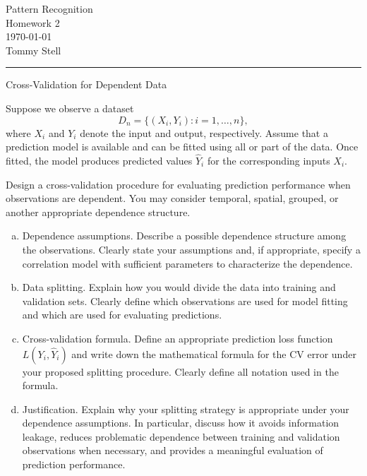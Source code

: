 \documentclass[12pt,letterpaper, onecolumn]{exam}
\begin{document}
\begingroup
    \centering
    \LARGE Pattern Recognition\\
    \LARGE Homework 2\\[0.5em]
    \large \today\\[0.5em]
    \large Tommy Stell\par

\endgroup
\noindent\rule{\textwidth}{0.4pt}
\pointsdroppedatright   %
\printanswers
\renewcommand{\solutiontitle}{\noindent\textbf{Ans:}\enspace}   %

\begin{questions}

    \question Cross-Validation for Dependent Data

    Suppose we observe a dataset
    \begin{equation*}
        D_n = \{(X_i, Y_i) : i = 1,\dots,n\},
    \end{equation*}
    where $X_i$ and $Y_i$ denote the input and output, respectively. Assume that a prediction model is available and can be fitted using all or part of the data. Once fitted, the model produces predicted values $\hat Y_i$ for the corresponding inputs $X_i$.

    Design a cross-validation procedure for evaluating prediction performance when observations are dependent. You may consider temporal, spatial, grouped, or another appropriate dependence structure.
    \begin{enumerate}[(a)]
        \item Dependence assumptions. Describe a possible dependence structure among the observations. Clearly state your assumptions and, if appropriate, specify a correlation model with sufficient parameters to characterize the dependence.
        \item Data splitting. Explain how you would divide the data into training and validation sets. Clearly define which observations are used for model fitting and which are used for evaluating predictions.
        \item Cross-validation formula. Define an appropriate prediction loss function $L(Y_i,\hat Y_i)$ and write down the mathematical formula for the CV error under your proposed splitting procedure. Clearly define all notation used in the formula.
        \item Justification. Explain why your splitting strategy is appropriate under your dependence assumptions. In particular, discuss how it avoids information leakage, reduces problematic dependence between training and validation observations when necessary, and provides a meaningful evaluation of prediction performance.
    \end{enumerate}


\end{questions}
\end{document}
